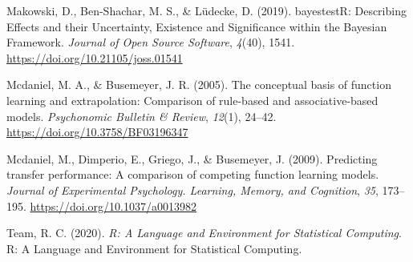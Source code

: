 \documentclass[
  letterpaper,
  DIV=11,
  numbers=noendperiod,
  oneside]{scrartcl}
\newlength{\cslhangindent}
\newenvironment{CSLReferences}[2] %
 {\begin{list}{}{%
  \setlength{\itemindent}{0pt}
  \setlength{\leftmargin}{0pt}
  \setlength{\parsep}{0pt}
  \ifodd #1
   \setlength{\leftmargin}{\cslhangindent}
   \setlength{\itemindent}{-1\cslhangindent}
  \fi
  \setlength{\itemsep}{#2\baselineskip}}}
 {\end{list}}
\begin{document}
\begin{CSLReferences}{1}{0}
Makowski, D., Ben-Shachar, M. S., \& Lüdecke, D. (2019). {bayestestR}:
{Describing Effects} and their {Uncertainty}, {Existence} and
{Significance} within the {Bayesian Framework}. \emph{Journal of Open
Source Software}, \emph{4}(40), 1541.
\url{https://doi.org/10.21105/joss.01541}

Mcdaniel, M. A., \& Busemeyer, J. R. (2005). The conceptual basis of
function learning and extrapolation: {Comparison} of rule-based and
associative-based models. \emph{Psychonomic Bulletin \& Review},
\emph{12}(1), 24--42. \url{https://doi.org/10.3758/BF03196347}

Mcdaniel, M., Dimperio, E., Griego, J., \& Busemeyer, J. (2009).
Predicting transfer performance: {A} comparison of competing function
learning models. \emph{Journal of Experimental Psychology. Learning,
Memory, and Cognition}, \emph{35}, 173--195.
\url{https://doi.org/10.1037/a0013982}

Team, R. C. (2020). \emph{R: {A Language} and {Environment} for
{Statistical Computing}}. R: A Language and Environment for Statistical
Computing.

\end{CSLReferences}
\end{document}

